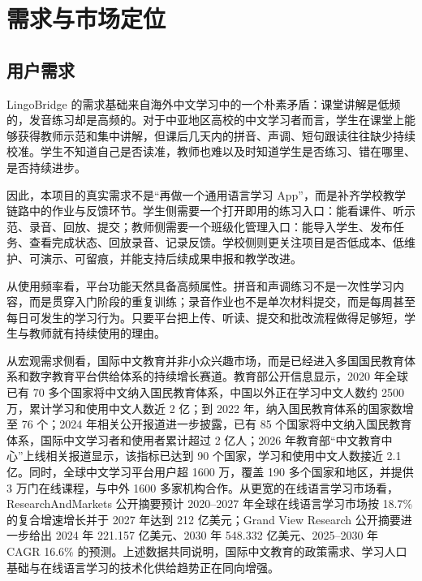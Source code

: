 \chapter{需求与市场定位}

\section{用户需求}
LingoBridge 的需求基础来自海外中文学习中的一个朴素矛盾：课堂讲解是低频的，发音练习却是高频的。对于中亚地区高校的中文学习者而言，学生在课堂上能够获得教师示范和集中讲解，但课后几天内的拼音、声调、短句跟读往往缺少持续校准。学生不知道自己是否读准，教师也难以及时知道学生是否练习、错在哪里、是否持续进步。

因此，本项目的真实需求不是“再做一个通用语言学习 App”，而是补齐学校教学链路中的作业与反馈环节。学生侧需要一个打开即用的练习入口：能看课件、听示范、录音、回放、提交；教师侧需要一个班级化管理入口：能导入学生、发布任务、查看完成状态、回放录音、记录反馈。学校侧则更关注项目是否低成本、低维护、可演示、可留痕，并能支持后续成果申报和教学改进。

从使用频率看，平台功能天然具备高频属性。拼音和声调练习不是一次性学习内容，而是贯穿入门阶段的重复训练；录音作业也不是单次材料提交，而是每周甚至每日可发生的学习行为。只要平台把上传、听读、提交和批改流程做得足够短，学生与教师就有持续使用的理由。

从宏观需求侧看，国际中文教育并非小众兴趣市场，而是已经进入多国国民教育体系和数字教育平台供给体系的持续增长赛道。教育部公开信息显示，2020 年全球已有 70 多个国家将中文纳入国民教育体系，中国以外正在学习中文人数约 2500 万，累计学习和使用中文人数近 2 亿\cite{Ref-MOEChinese2020}；到 2022 年，纳入国民教育体系的国家数增至 76 个\cite{Ref-MOEChinese2022}；2024 年相关公开报道进一步披露，已有 85 个国家将中文纳入国民教育体系，国际中文学习者和使用者累计超过 2 亿人\cite{Ref-GQBChinese2024}；2026 年教育部“中文教育中心”上线相关报道显示，该指标已达到 90 个国家，学习和使用中文人数接近 2.1 亿\cite{Ref-GQBChinese2026}。同时，全球中文学习平台用户超 1600 万，覆盖 190 多个国家和地区，并提供 3 万门在线课程，与中外 1600 多家机构合作\cite{Ref-MOEChinesePlatform2025}。从更宽的在线语言学习市场看，ResearchAndMarkets 公开摘要预计 2020--2027 年全球在线语言学习市场按 18.7\% 的复合增速增长并于 2027 年达到 212 亿美元\cite{Ref-ResearchAndMarkets2020}；Grand View Research 公开摘要进一步给出 2024 年 221.157 亿美元、2030 年 548.332 亿美元、2025--2030 年 CAGR 16.6\% 的预测\cite{Ref-GrandViewOLL2025}。上述数据共同说明，国际中文教育的政策需求、学习人口基础与在线语言学习的技术化供给趋势正在同向增强。

